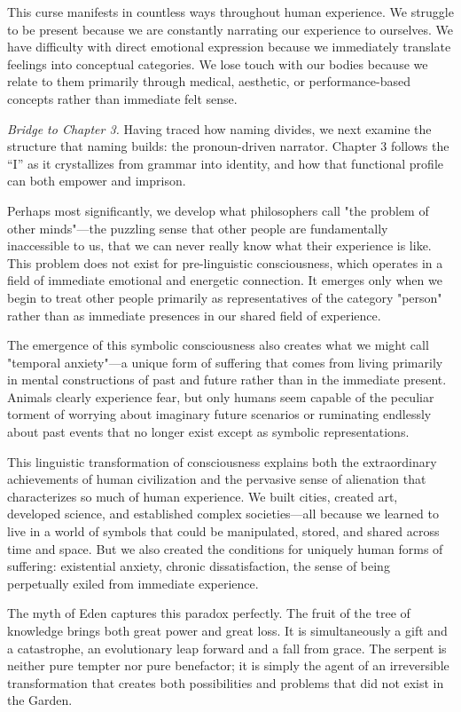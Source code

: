 This curse manifests in countless ways throughout human experience. We struggle to be present because we are constantly narrating our experience to ourselves. We have difficulty with direct emotional expression because we immediately translate feelings into conceptual categories. We lose touch with our bodies because we relate to them primarily through medical, aesthetic, or performance-based concepts rather than immediate felt sense.

\bigskip
\noindent\textit{Bridge to Chapter 3.} Having traced how naming divides, we next examine the structure that naming builds: the pronoun-driven narrator. Chapter 3 follows the “I” as it crystallizes from grammar into identity, and how that functional profile can both empower and imprison.

Perhaps most significantly, we develop what philosophers call "the problem of other minds"—the puzzling sense that other people are fundamentally inaccessible to us, that we can never really know what their experience is like. This problem does not exist for pre-linguistic consciousness, which operates in a field of immediate emotional and energetic connection. It emerges only when we begin to treat other people primarily as representatives of the category "person" rather than as immediate presences in our shared field of experience.

The emergence of this symbolic consciousness also creates what we might call "temporal anxiety"—a unique form of suffering that comes from living primarily in mental constructions of past and future rather than in the immediate present. Animals clearly experience fear, but only humans seem capable of the peculiar torment of worrying about imaginary future scenarios or ruminating endlessly about past events that no longer exist except as symbolic representations.

This linguistic transformation of consciousness explains both the extraordinary achievements of human civilization and the pervasive sense of alienation that characterizes so much of human experience. We built cities, created art, developed science, and established complex societies—all because we learned to live in a world of symbols that could be manipulated, stored, and shared across time and space. But we also created the conditions for uniquely human forms of suffering: existential anxiety, chronic dissatisfaction, the sense of being perpetually exiled from immediate experience.

The myth of Eden captures this paradox perfectly. The fruit of the tree of knowledge brings both great power and great loss. It is simultaneously a gift and a catastrophe, an evolutionary leap forward and a fall from grace. The serpent is neither pure tempter nor pure benefactor; it is simply the agent of an irreversible transformation that creates both possibilities and problems that did not exist in the Garden.

